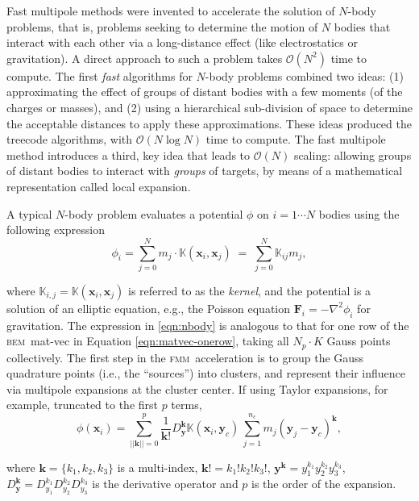 \documentclass[final,leqno,]{siamltex1213}
\newcommand{\K}{\mathbb{K}}
\newcommand{\bem}{\textsc{bem}\xspace}
\newcommand{\fmm}{\textsc{fmm}\xspace}
\newcommand{\bigO}{\mathcal{O}}
\renewcommand{\O}[1]{\mathcal{O}(#1)}
\newcommand{\vect}[1]{\mathbf{#1}}
\begin{document}
Fast multipole methods were invented to accelerate the solution of $N$-body problems, that is, problems seeking to determine the motion of $N$ bodies that interact with each other via a long-distance effect (like electrostatics or gravitation). A direct approach to such a problem takes $\O{N^{2}}$ time to compute. The first \emph{fast} algorithms for $N$-body problems \cite{Appel1985,BarnesHut1986} combined two ideas: (1) approximating the effect of groups of distant bodies with a few moments (of the charges or masses), and (2) using a hierarchical sub-division of space to determine the acceptable distances to apply these approximations.
 These ideas produced the treecode algorithms, with $\bigO(N\log N)$ time to compute.
The fast multipole method \cite{GreengardRokhlin1987} introduces a third, key idea that leads to $\bigO(N)$ scaling: allowing groups of distant bodies to interact with \emph{groups} of targets, by means of a mathematical representation called local expansion.

A typical $N$-body problem evaluates a potential $\phi$ on $i=1\cdots N$ bodies
using the following expression
%
\begin{equation}\label{eqn:nbody}
	\phi_{i} = \sum_{j=0}^{N} m_{j}\cdot\K(\vect{x}_{i},\vect{x}_{j}) \; = \; \sum_{j=0}^{N}\K_{ij}m_{j},
\end{equation}

\noindent where $\K_{i,j} = \K(\vect{x}_{i},\vect{x}_{j})$ is referred to as the \emph{kernel}, and the potential is a solution of an elliptic equation, e.g., the Poisson equation $\vect{F}_i = - \nabla^2 \phi_i$ for gravitation. The expression in \eqref{eqn:nbody} is analogous to that for one row of the \bem\ mat-vec in Equation \eqref{eqn:matvec-onerow}, taking all $N_p \cdot K$ Gauss points collectively.
The first step in the \fmm\ acceleration is to group the Gauss quadrature points (i.e., the ``sources'') into clusters, and represent their influence via multipole expansions at the cluster center. If using Taylor expansions, for example, truncated to the first $p$ terms,
%
\begin{equation}
	\phi(\vect{x}_i) = \sum_{||\vect{k}||=0}^{p}\frac{1}{\vect{k}!}D^{\vect{k}}_{\vect{y}} \K(\vect{x}_i,\vect{y}_c)\, \sum_{j=1}^{n_c} m_j (\vect{y}_j-\vect{y}_c)^{\vect{k}},
	\label{eqn:cartesian_multipole}
\end{equation}

\noindent where $\vect{k}=\{k_1, k_2, k_3\}$ is a multi-index, $\vect{k}! = k_1!k_2!k_3!$, $\vect{y}^{\vect{k}} = y_1^{k_1}y_2^{k_2}y_3^{k_3}$, $D_{\vect{y}}^{\vect{k}} = D^{k_1}_{y_1}D^{k_2}_{y_2}D^{k_3}_{y_3}$ is the derivative operator and $p$ is the order of the expansion.
\end{document}
